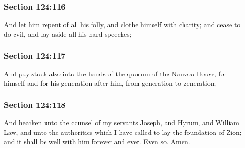	\subsubsection{Section 124:116} %
		\label{DC124-116}

		And let him repent of all his folly, and clothe himself with charity; and cease to do evil, and lay aside all his hard speeches;


	\subsubsection{Section 124:117} %
		\label{DC124-117}

		And pay stock also into the hands of the quorum of the Nauvoo House, for himself and for his generation after him, from generation to generation;


	\subsubsection{Section 124:118} %
		\label{DC124-118}

		And hearken unto the counsel of my servants Joseph, and Hyrum, and William Law, and unto the authorities which I have called to lay the foundation of Zion; and it shall be well with him forever and ever.  Even so.  Amen.


